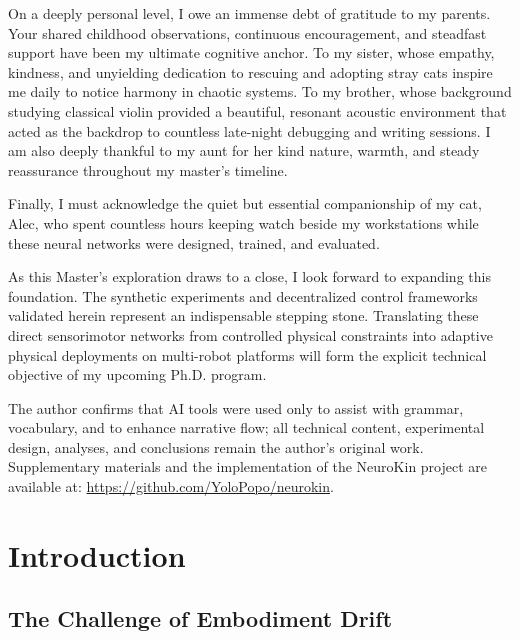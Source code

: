 \documentclass[12pt,a4paper,oneside]{report}
\begin{document}
On a deeply personal level, I owe an immense debt of gratitude to my parents. Your shared childhood observations, continuous encouragement, and steadfast support have been my ultimate cognitive anchor. To my sister, whose empathy, kindness, and unyielding dedication to rescuing and adopting stray cats inspire me daily to notice harmony in chaotic systems. To my brother, whose background studying classical violin provided a beautiful, resonant acoustic environment that acted as the backdrop to countless late-night debugging and writing sessions. I am also deeply thankful to my aunt for her kind nature, warmth, and steady reassurance throughout my master's timeline.

Finally, I must acknowledge the quiet but essential companionship of my cat, Alec, who spent countless hours keeping watch beside my workstations while these neural networks were designed, trained, and evaluated. 

As this Master's exploration draws to a close, I look forward to expanding this foundation. The synthetic experiments and decentralized control frameworks validated herein represent an indispensable stepping stone. Translating these direct sensorimotor networks from controlled physical constraints into adaptive physical deployments on multi-robot platforms will form the explicit technical objective of my upcoming Ph.D. program.

The author confirms that AI tools were used only to assist with grammar, vocabulary, and to enhance narrative flow; all technical content, experimental design, analyses, and conclusions remain the author's original work. Supplementary materials and the implementation of the NeuroKin project are available at: \url{https://github.com/YoloPopo/neurokin}.

\clearpage

\tableofcontents
\clearpage
\listoffigures
{}
\clearpage
\listoftables
{}
\clearpage


\chapter{Introduction}
\label{chap:intro}

\section{The Challenge of Embodiment Drift}
\label{sec:challenge_embodiment_drift}
\end{document}

